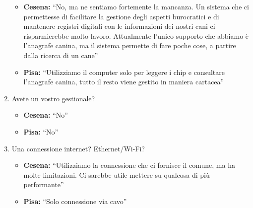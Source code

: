 \documentclass{report}
\begin{document}
\begin{enumerate}
  \begin{itemize}
  \tightlist
  \item
    \textbf{Cesena:} ``No, ma ne sentiamo fortemente la mancanza. Un
    sistema che ci permettesse di facilitare la gestione degli aspetti
    burocratici e di mantenere registri digitali con le informazioni dei
    nostri cani ci risparmierebbe molto lavoro. Attualmente l'unico
    supporto che abbiamo è l'anagrafe canina, ma il sistema permette di
    fare poche cose, a partire dalla ricerca di un cane''
  \item
    \textbf{Pisa: }``Utilizziamo il computer solo per leggere i chip e
    consultare l'anagrafe canina, tutto il resto viene gestito in
    maniera cartacea''
  \end{itemize}
\item
  Avete un vostro gestionale?

  \begin{itemize}
  \tightlist
  \item
    \textbf{Cesena:} ``No''
  \item
    \textbf{Pisa: }``No''
  \end{itemize}
\item
  Una connessione internet? Ethernet/Wi-Fi?

  \begin{itemize}
  \tightlist
  \item
    \textbf{Cesena:} ``Utilizziamo la connessione che ci fornisce il
    comune, ma ha molte limitazioni. Ci sarebbe utile mettere su
    qualcosa di più performante''
  \item
    \textbf{Pisa: }``Solo connessione via cavo''
  \end{itemize}
\end{enumerate}

\begin{quote}
\end{quote}
\end{document}

